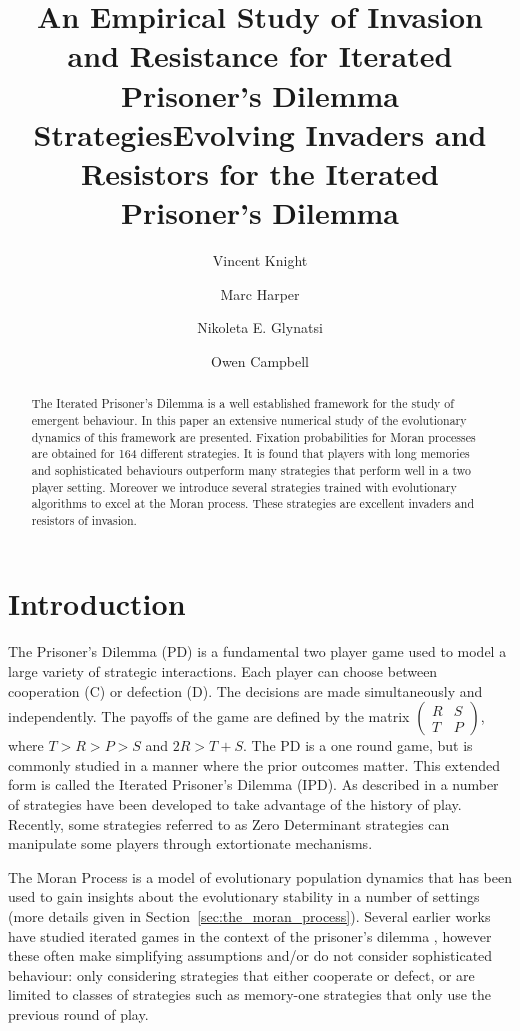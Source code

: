 \documentclass{article}
\title{An Empirical Study of Invasion and Resistance
       for Iterated Prisoner's Dilemma Strategies}
\title{Evolving Invaders and Resistors for the Iterated Prisoner's Dilemma}
\author{Vincent Knight \and
        Marc Harper \and
        Nikoleta E. Glynatsi \and
        Owen Campbell} %
\date{}
\begin{document}
\maketitle

\begin{abstract}
    The Iterated Prisoner's Dilemma is a well established framework for
    the study of emergent behaviour. In this paper an extensive numerical
    study of the evolutionary dynamics of this framework are presented. Fixation
    probabilities for Moran processes are obtained for 164
    different strategies. It is found that players with long memories and
    sophisticated behaviours outperform many strategies that perform well
    in a two player setting. Moreover we introduce several strategies
    trained with evolutionary algorithms to excel at the Moran process.
    These strategies are excellent invaders and resistors of invasion.
\end{abstract}

\section{Introduction}\label{sec:introduction}

The Prisoner's Dilemma (PD) \cite{Flood1958} is a fundamental two player game
used to model a large variety of strategic interactions. Each player can choose
between cooperation (C) or defection (D). The decisions are made simultaneously
and independently. The payoffs of
the game are defined by the matrix $\begin{pmatrix} R & S \\ T & P
\end{pmatrix}$, where $T > R > P > S$ and $2R > T + S$. The PD is a one
round game, but is commonly studied in a manner where the prior outcomes
matter. This extended form is called the Iterated Prisoner's
Dilemma (IPD). As described in \cite{Axelrod1980a, Knight2016, Press2012} a
number of strategies have been developed to take advantage of the history of
play. Recently, some strategies referred to as Zero Determinant strategies
\cite{Press2012} can manipulate some players through extortionate mechanisms.

The Moran Process \cite{Moran1957} is a model of
evolutionary population dynamics that has been used to gain insights about the
evolutionary stability in a number of settings (more details given in
Section~\ref{sec:the_moran_process}).
Several earlier
works have studied iterated games in the context of the prisoner's dilemma
\cite{Nowak, Stewart2012}, however these often make simplifying assumptions
and/or do not consider sophisticated behaviour: only considering strategies that
either cooperate or defect, or are limited to classes of strategies
such as memory-one strategies that only use the previous round of play.
\end{document}
